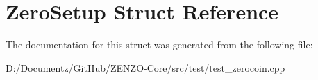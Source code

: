 \hypertarget{struct_zero_setup}{}\section{Zero\+Setup Struct Reference}
\label{struct_zero_setup}


The documentation for this struct was generated from the following file\+:\begin{DoxyCompactItemize}
\item 
D\+:/\+Documentz/\+Git\+Hub/\+Z\+E\+N\+Z\+O-\/\+Core/src/test/test\+\_\+zerocoin.\+cpp\end{DoxyCompactItemize}
